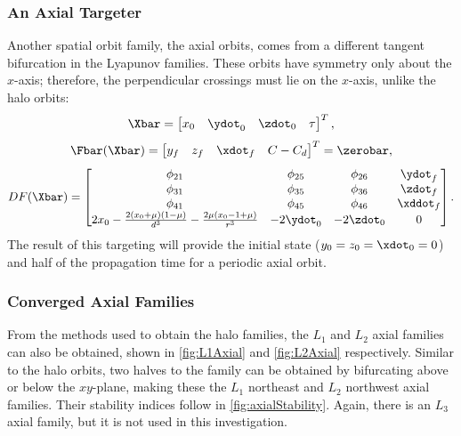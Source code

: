 \subsubsection{An Axial Targeter}
Another spatial orbit family, the axial orbits, comes from a different tangent bifurcation in the
Lyapunov families. These orbits have symmetry only about the $x$-axis; therefore, the perpendicular
crossings must lie on the $x$-axis, unlike the halo orbits:
\begin{equation}
    \Xbar=\begin{bmatrix}   x_{0}   &   \ydot_{0}   &   \zdot_{0}   &   \tau    \end{bmatrix}^{T},
    \label{eq:axialfreevar}
\end{equation}
\begin{equation}
    \Fbar(\Xbar)=\begin{bmatrix}    y_{f}   &   z_{f}   &   \xdot_{f}   &   C-C_{d} \end{bmatrix}^{T}=\zerobar,
    \label{eq:axialconst}
\end{equation}
\begin{equation}
    DF(\Xbar)=\begin{bmatrix}   \phi_{21}                                                                   &   \phi_{25}   &   \phi_{26}   &   \ydot_{f}   \\
                                \phi_{31}                                                                   &   \phi_{35}   &   \phi_{36}   &   \zdot_{f}   \\
                                \phi_{41}                                                                   &   \phi_{45}   &   \phi_{46}   &   \xddot_{f}  \\
                                2x_{0}-\frac{2(x_{0}+\mu)(1-\mu)}{d^{3}}-\frac{2\mu(x_{0}-1+\mu)}{r^{3}}    &   -2\ydot_{0} &   -2\zdot_{0} &   0           \end{bmatrix}.
    \label{eq:axialjacobian}
\end{equation}
The result of this targeting will provide the initial state ($y_{0}=z_{0}=\xdot_{0}=0$) and half of
the propagation time for a periodic axial orbit.

\subsubsection{Converged Axial Families}
From the methods used to obtain the halo families, the $L_{1}$ and $L_{2}$ axial families can also
be obtained, shown in \cref{fig:L1Axial} and \cref{fig:L2Axial} respectively. Similar to the halo
orbits, two halves to the family can be obtained by bifurcating above or below the $xy$-plane,
making these the $L_{1}$ northeast and $L_{2}$ northwest axial families. Their stability indices
follow in \cref{fig:axialStability}. Again, there is an $L_{3}$ axial family, but it is not used in
this investigation.

